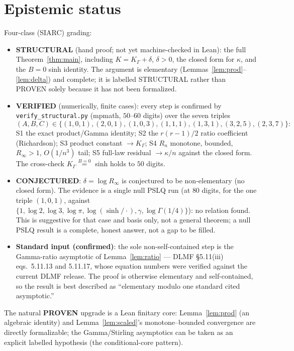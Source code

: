\documentclass[11pt]{article}
\begin{document}
\section*{Epistemic status}
Four-class (SIARC) grading:
\begin{itemize}
\item \textbf{STRUCTURAL} (hand proof; not yet machine-checked in Lean): the full
Theorem~\ref{thm:main}, including $K=K_\Gamma+\delta$, $\delta>0$, the closed form
for $\kappa$, and the $B=0$ sinh identity. The argument is elementary
(Lemmas~\ref{lem:prod}--\ref{lem:delta}) and complete; it is labelled STRUCTURAL
rather than PROVEN solely because it has not been formalized.
\item \textbf{VERIFIED} (numerically, finite cases): every step is confirmed by
\texttt{verify\_structural.py} (mpmath, $50$--$60$ digits) over the seven triples
\[
  (A,B,C)\in\{(1,0,1),(2,0,1),(1,0,3),(1,1,1),(1,3,1),(3,2,5),(2,3,7)\}:
\]
S1 the exact product/Gamma identity; S2 the $r(r-1)/2$ ratio coefficient
(Richardson); S3 product constant $\to K_\Gamma$; S4 $R_n$ monotone, bounded,
$R_\infty>1$, $O(1/n^3)$ tail; S5 full-law residual $\to\kappa/n$ against the
closed form. The cross-check $K_\Gamma\overset{B=0}{=}$ sinh holds to $50$ digits.
\item \textbf{CONJECTURED}: $\delta=\log R_\infty$ is conjectured to be
non-elementary (no closed form). The evidence is a single null PSLQ run (at $80$
digits, for the one triple $(1,0,1)$, against $\{1,\log2,\log3,\log\pi,
\log(\sinh/\cdot),\gamma,\log\Gamma(1/4)\}$): no relation found. This is suggestive
for that case and basis only, not a general theorem; a null PSLQ result is a
complete, honest answer, not a gap to be filled.
\item \textbf{Standard input (confirmed)}: the sole non-self-contained step is the
Gamma-ratio asymptotic of Lemma~\ref{lem:ratio} --- DLMF \S5.11(iii) eqs.~5.11.13
and 5.11.17, whose equation numbers were verified against the current DLMF
release. The proof is otherwise elementary and self-contained, so the result is
best described as ``elementary modulo one standard cited asymptotic.''
\end{itemize}
The natural \textbf{PROVEN} upgrade is a Lean finitary core: Lemma~\ref{lem:prod}
(an algebraic identity) and Lemma~\ref{lem:scaled}'s monotone--bounded convergence
are directly formalizable; the Gamma/Stirling asymptotics can be taken as an
explicit labelled hypothesis (the conditional-core pattern).
\end{document}
